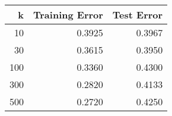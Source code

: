 \begin{tabular}{rrr}
\toprule
k & Training Error & Test Error \\
\midrule
10 & 0.3925 & 0.3967 \\
30 & 0.3615 & 0.3950 \\
100 & 0.3360 & 0.4300 \\
300 & 0.2820 & 0.4133 \\
500 & 0.2720 & 0.4250 \\
\bottomrule
\end{tabular}
